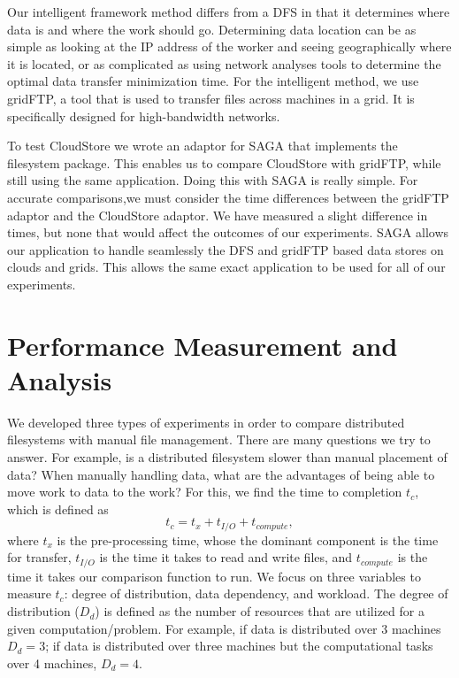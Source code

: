 \documentclass{rspublic}
\newcommand{\micnote}[1]{ {\textcolor{blue} { ***Michael: #1 }}}
\newcommand{\betynote}[1]{ {\textcolor{orange} { ***Bety: #1 }}}
\newcommand{\jhanote}[1]{} \newcommand{\micnote}[1]{}\newcommand{\betynote}[1]{} \newcommand{\fixme}[1]{}
\begin{document}
Our intelligent framework method differs from a DFS in that it
determines where data is and where the work should go. Determining
data location can be as simple as looking at the IP address of the
worker and seeing geographically where it is located, or as
complicated as using network analyses tools to determine the optimal
data transfer minimization time. For the intelligent method, we use
gridFTP\jhanote{place proper citation for gridftp}, a tool that is
used to transfer files across machines in a grid. It is specifically
designed for high-bandwidth networks.

To test CloudStore we wrote an adaptor for SAGA that implements the
filesystem package. This enables us to compare CloudStore with
gridFTP, while still using the same application. Doing this with SAGA
is really simple. For accurate comparisons,we must consider the time
differences between the gridFTP adaptor and the CloudStore adaptor. We
have measured a slight difference in times, but none that would affect
the outcomes of our experiments.  SAGA allows our application to
handle seamlessly the DFS and gridFTP based data stores on clouds and
grids.  This allows the same exact application to be used for all of
our experiments.




\section{Performance Measurement and Analysis} We developed three types
of experiments in order to compare distributed filesystems with manual
file management. There are many questions we try to answer. For
example, is a distributed filesystem slower than manual
placement of data? When manually handling data, what are the advantages
of being able to move work to data to the work? For this, we find the
time to completion $t_c$, which is defined as
 \begin{equation}
t_c = t_x + t_{I/O} + t_{compute},
\end{equation}
where $t_x$ is the pre-processing time, whose the dominant component is
the time for transfer, $t_{I/O}$ is the time it takes to read and write
files, and $t_{compute}$ is the time it takes our comparison function to
run. We focus on three variables to measure $t_c$: degree of
distribution, data dependency, and workload. The degree of distribution
($D_d$) is defined as the number of resources that are utilized for a
given computation/problem. For example, if data is distributed over 3
machines $D_d=3$; if data is distributed over three machines but the
computational tasks over 4 machines, $D_d=4$.
\end{document}
